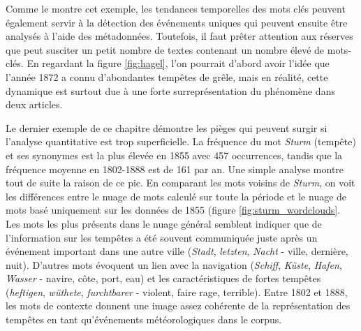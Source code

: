 \documentclass[a4paper,twoside,12pt]{article}
\begin{document}
Comme le montre cet exemple, les tendances temporelles des mots clés peuvent également servir à la détection des événements uniques qui peuvent ensuite être analysés à l'aide des métadonnées. Toutefois, il faut prêter attention aux réserves que peut susciter un petit nombre de textes contenant un nombre élevé de mots-clés. En regardant la figure \ref{fig:hagel}, l'on pourrait d'abord avoir l'idée que l'année 1872 a connu d'abondantes tempêtes de grêle, mais en réalité, cette dynamique est surtout due à une forte surreprésentation du phénomène dans deux articles.

Le dernier exemple de ce chapitre démontre les pièges qui peuvent surgir si l'analyse quantitative est trop superficielle. La fréquence du mot \textit{Sturm} (tempête) et ses synonymes est la plus élevée en 1855 avec 457 occurrences, tandis que la fréquence moyenne en 1802-1888 est de 161 par an. Une simple analyse montre tout de suite la raison de ce pic. En comparant les mots voisins de \textit{Sturm}, on voit les différences entre le nuage de mots calculé sur toute la période et le nuage de mots basé uniquement sur les données de 1855 (figure \ref{fig:sturm_wordclouds}. Les mots les plus présents dans le nuage général semblent indiquer que de l'information sur les tempêtes a été souvent communiquée juste après un événement important dans une autre ville (\textit{Stadt}, \textit{letzten}, \textit{Nacht} - ville, dernière, nuit). D'autres mots évoquent un lien avec la navigation (\textit{Schiff}, \textit{Küste}, \textit{Hafen}, \textit{Wasser} - navire, côte, port, eau) et les caractéristiques de fortes tempêtes (\textit{heftigen}, \textit{wüthete}, \textit{furchtbarer} - violent, faire rage, terrible). Entre 1802 et 1888, les mots de contexte donnent une image assez cohérente de la représentation des tempêtes en tant qu'événements météorologiques dans le corpus.
\end{document}
